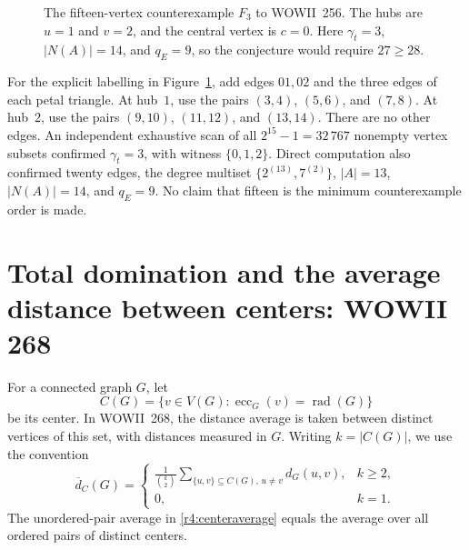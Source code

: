 \documentclass[11pt,a4paper]{article}
\theoremstyle{remark}
\begin{document}
\begin{figure}[htbp]
\centering
{}
\caption{The fifteen-vertex counterexample $F_3$ to WOWII~256.
The hubs are $u=1$ and $v=2$, and the central vertex is $c=0$.
Here $\gamma_t=3$, $|N(A)|=14$, and $q_E=9$, so the conjecture would
require $27\ge28$.}
\label{newce:fig:256}
\end{figure}

For the explicit labelling in Figure~\ref{newce:fig:256}, add edges
$01,02$ and the three edges of each petal triangle.  At hub~$1$, use
the pairs $(3,4)$, $(5,6)$, and $(7,8)$.  At hub~$2$, use the pairs
$(9,10)$, $(11,12)$, and $(13,14)$.  There are no other edges.
An independent exhaustive scan of all
$2^{15}-1=32\,767$ nonempty vertex subsets confirmed
$\gamma_t=3$, with witness $\{0,1,2\}$.
Direct computation also confirmed twenty edges, the degree multiset
$\{2^{(13)},7^{(2)}\}$, $|A|=13$, $|N(A)|=14$, and $q_E=9$.
No claim that fifteen is the minimum counterexample order is made.

\section{Total domination and the average distance between centers: WOWII 268}
\label{r4:sec268}

For a connected graph $G$, let
\[
 C(G)=\{v\in V(G):\operatorname{ecc}_G(v)=\operatorname{rad}(G)\}
\]
be its center.  In WOWII~268, the distance average is taken between
distinct vertices of this set, with distances measured in $G$.
Writing $k=|C(G)|$, we use the convention
\begin{equation}
 \label{r4:centeraverage}
 \overline d_C(G)=
 \begin{cases}
 \displaystyle\frac{1}{\binom{k}{2}}
       \sum_{\{u,v\}\subseteq C(G),\,u\ne v}d_G(u,v),&k\ge2,\\[6pt]
 0,&k=1.
 \end{cases}
\end{equation}
The unordered-pair average in \eqref{r4:centeraverage} equals the average
over all ordered pairs of distinct centers.
\end{document}
